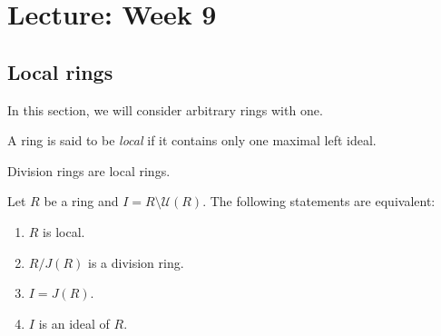\section{Lecture: Week 9}
\label{09}

\subsection{Local rings}

In this section, we will consider arbitrary rings with one. 

\begin{definition}
    A ring is said to be \emph{local} if it contains only one maximal left ideal. 
\end{definition}

Division rings are local rings. 


\begin{theorem}
\label{thm:local}
    Let $R$ be a ring and $I=R\setminus\mathcal{U}(R)$. The following
    statements are equivalent:
    \begin{enumerate}
        \item $R$ is local.
        \item $R/J(R)$ is a division ring.
        \item $I=J(R)$.
        \item $I$ is an ideal of $R$.
    \end{enumerate}
\end{theorem}

